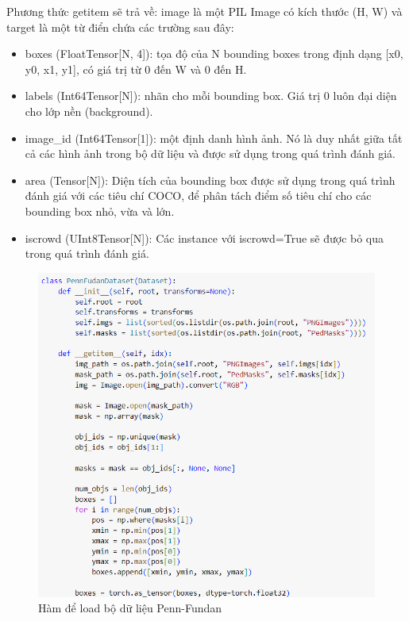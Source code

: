 Phương thức getitem sẽ trả về: image là một PIL Image có kích thước (H, W) và target là một từ điển chứa các trường sau đây:
\begin{itemize}[noitemsep, topsep=0pt, leftmargin=1.25em, label={$-$}]
    \item boxes (FloatTensor[N, 4]): tọa độ của N bounding boxes trong định dạng [x0, y0, x1, y1], có giá trị từ 0 đến W và 0 đến H.
    \item labels (Int64Tensor[N]): nhãn cho mỗi bounding box. Giá trị 0 luôn đại diện cho lớp nền (background).
    \item image\_id (Int64Tensor[1]): một định danh hình ảnh. Nó là duy nhất giữa tất cả các hình ảnh trong bộ dữ liệu và được sử dụng trong quá trình đánh giá.
    \item area (Tensor[N]): Diện tích của bounding box được sử dụng trong quá trình đánh giá với các tiêu chí COCO, để phân tách điểm số tiêu chí cho các bounding box nhỏ, vừa và lớn.
    \item iscrowd (UInt8Tensor[N]): Các instance với iscrowd=True sẽ được bỏ qua trong quá trình đánh giá.
\end{itemize}
\begin{figure}[h!]
  \centering
  \includegraphics[scale=0.65]{graphics/loaddata.png}
  \caption{Hàm để load bộ dữ liệu Penn-Fundan}
\end{figure}
\pagebreak

